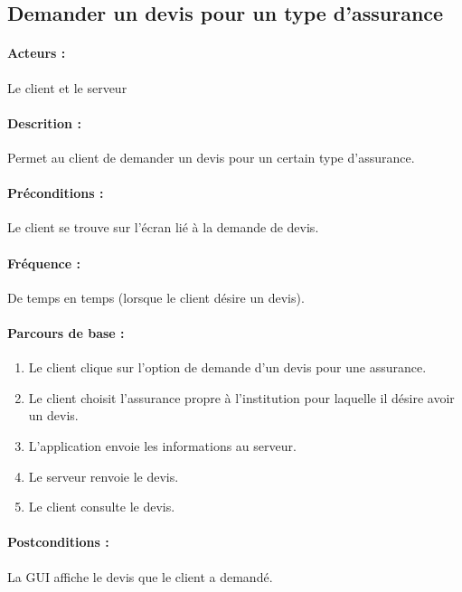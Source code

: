 \documentclass[../annexe.tex]{subfiles}
\begin{document}
\subsection{Demander un devis pour un type d'assurance}

\paragraph{Acteurs :} Le client et le serveur 


\paragraph{Descrition :} Permet au client de demander un devis pour un certain type d'assurance.


\paragraph{Préconditions :} Le client se trouve sur l'écran lié à la demande de devis.


\paragraph{Fréquence :} De temps en temps (lorsque le client désire un devis).



\paragraph{Parcours de base :}

	\begin{enumerate}
	
		\item Le client clique sur l'option de demande d'un devis pour une assurance.
		\item Le client choisit l'assurance propre à l'institution pour laquelle il désire avoir un devis.
		\item L'application envoie les informations au serveur.
		\item Le serveur renvoie le devis.
		\item Le client consulte le devis.
	\end{enumerate}
	
\paragraph{Postconditions :} La GUI affiche le devis que le client a demandé.
\end{document}
